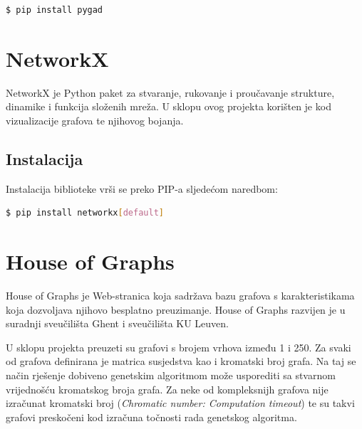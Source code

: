\documentclass[times, utf8, zavrsni]{fer}
\begin{document}
\begin{lstlisting}[language=bash]
  $ pip install pygad
\end{lstlisting}

\section{NetworkX}
NetworkX je Python paket za stvaranje, rukovanje i proučavanje strukture, dinamike i funkcija složenih mreža. U sklopu ovog projekta korišten je kod vizualizacije grafova te njihovog bojanja.

\subsection{Instalacija}
Instalacija biblioteke vrši se preko PIP-a sljedećom naredbom:

\begin{lstlisting}[language=bash]
  $ pip install networkx[default]
\end{lstlisting}

\section{House of Graphs}
House of Graphs je Web-stranica koja sadržava bazu grafova s karakteristikama koja dozvoljava njihovo besplatno preuzimanje. House of Graphs razvijen je u suradnji sveučilišta Ghent i sveučilišta KU Leuven.

U sklopu projekta preuzeti su grafovi s brojem vrhova između 1 i 250. Za svaki od grafova definirana je matrica susjedstva kao i kromatski broj grafa. Na taj se način rješenje dobiveno genetskim algoritmom može usporediti sa stvarnom vrijednošću kromatskog broja grafa. Za neke od kompleksnijh grafova nije izračunat kromatski broj (\textit{Chromatic number: Computation timeout}) te su takvi grafovi preskočeni kod izračuna točnosti rada genetskog algoritma.
\end{document}
